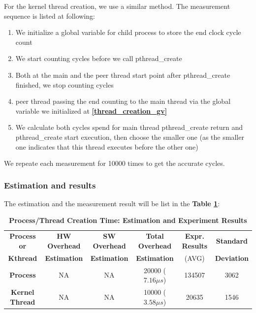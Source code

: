 For the kernel thread creation, we use a similar method. The measurement sequence is listed at following:
\begin{enumerate}
    \item We initialize a global variable for child process to store the end clock cycle count \label{thread_creation_gv}
    \item We start counting cycles before we call pthread\_create
    \item Both at the main and the peer thread start point after pthread\_create finished, we stop counting cycles
    \item peer thread passing the end counting to the main thread via the global variable we initialized at \textbf{\ref{thread_creation_gv}}
    \item We calculate both cycles spend for main thread pthread\_create return and pthread\_create start execution, then choose the smaller one (as the smaller one indicates that this thread executes before the other one)
\end{enumerate}

We repeate each measurement for 10000 times to get the accurate cycles.

\subsubsection{Estimation and results}

The estimation and the measurement result will be list in the \textbf{Table \ref{process_creation_time}}:

\begin{table}[ht]
  \centering
  \caption{\textbf{Process/Thread Creation Time: Estimation and Experiment Results}}
  \begin{threeparttable}
  \begin{tabular}{cccccc}
  \hline
      \textbf{Process or} & \textbf{HW Overhead} & \textbf{SW Overhead } & \textbf{Total Overhead} & \textbf{Expr. Results} & \textbf{Standard}\\
      \textbf{Kthread} & \textbf{Estimation}       &  \textbf{Estimation}         & \textbf{Estimation}  & (AVG)   & \textbf{Deviation} \\
  \hline
      \textbf{Process} & NA & NA & 20000 ($7.16 \mu s$) & 134507 & 3062 \\
      \textbf{Kernel Thread} & NA & NA & 10000 ($3.58 \mu s$) & 20635 & 1546 \\
  \hline
  \end{tabular}
  \end{threeparttable}
  \label{process_creation_time}
\end{table}

